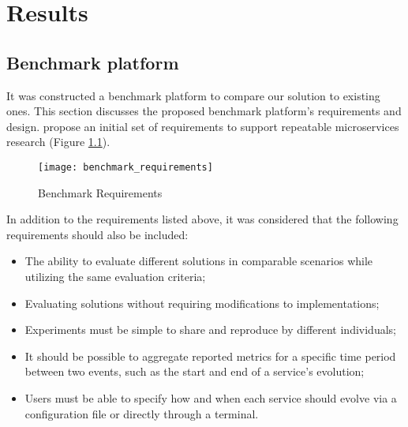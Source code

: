 
%

\chapter{Results}
\label{cha:results}

\section{Benchmark platform} %
\label{sec:benchmark_platform}

It was constructed a benchmark platform to compare our solution to existing ones.
This section discusses the proposed benchmark platform's requirements and design.
\citeauthor{microservices2017benchmark} \cite{microservices2017benchmark} propose an initial set of requirements
to support repeatable microservices research (Figure \ref{fig:benchmark}).

\begin{figure}[htbp]
    \centering
    \texttt{[image: benchmark\_requirements]}
    \caption{Benchmark Requirements \cite{microservices2017benchmark}}
    \label{fig:benchmark}
\end{figure}

In addition to the requirements listed above, it was considered that the following requirements should also be included:
\begin{itemize}
    \setlength\itemsep{0em}
    \item The ability to evaluate different solutions in comparable scenarios while utilizing the same evaluation criteria;
    \item Evaluating solutions without requiring modifications to implementations;
    \item Experiments must be simple to share and reproduce by different individuals;
    \item It should be possible to aggregate reported metrics for a specific time period between two events, such as the start and end of a service's evolution;
    \item Users must be able to specify how and when each service should evolve via a configuration file or directly through a terminal.
\end{itemize}

